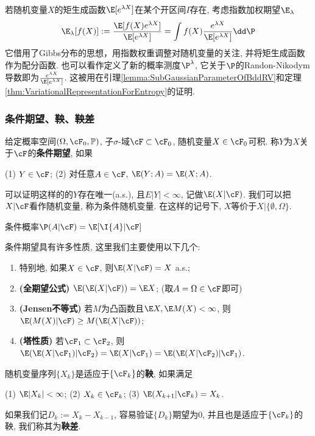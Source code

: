 \begin{example}[指数加权]
	若随机变量$X$的矩生成函数$\E[e^{\lambda X}]$在某个开区间$I$存在, 考虑指数加权期望$\E_{\lambda}$
	\begin{equation*}
		\E_{\lambda} [f(X)]
		:= \frac{\E[f(X) e^{\lambda X}]}{\E[e^{\lambda X}]}
		= \int f(X) \frac{e^{\lambda X}}{\E[e^{\lambda X}]} \dd \P 
	\end{equation*}
	它借用了Gibbs分布的思想，用指数权重调整对随机变量的关注, 并将矩生成函数作为配分函数.  
	也可以看作定义了新的概率测度$\P^{\lambda}$, 它关于$\P$的Randon-Nikodym导数即为$\frac{e^{\lambda X}}{\E[e^{\lambda X}]}$. 
	这被用在引理\ref{lemma:SubGaussianParameterOfBddRV}和定理\ref{thm:VariationalRepresentationForEntropy}的证明.
\end{example}



\subsubsection{条件期望、鞅、鞅差}

给定概率空间$(\Omega, \cF_0, \mathbb{P})$, 子$\sigma$-域$\cF \subset \cF_0$, 随机变量$X \in \cF_0$可积. 
称$Y$为$X$关于$\cF$的\textbf{条件期望}, 如果
\begin{center}
	(1) $Y \in \cF$; \quad
	(2) 对任意$A \in \cF$, $\E(Y;A) = \E(X;A)$. 
\end{center}
可以证明这样的的$Y$存在唯一(a.s.), 且$E|Y| < \infty$, 记做$\E(X|\cF)$. 
我们可以把$X | \cF$看作随机变量, 称为条件随机变量. 
在这样的记号下, $X$等价于$X | \{\emptyset, \Omega\}$. 

条件概率$\P(A | \cF) = \E[\I{A} | \cF]$

条件期望具有许多性质, 这里我们主要使用以下几个: 
	\begin{enumerate}[label=(\roman*)]
		\item 特别地, 如果$X \in \cF$, 则$\E(X|\cF) = X$ a.s.;
		\item \textbf{(全期望公式)} $\E(\E(X|\cF)) = \E X$; (取$A = \Omega \in \cF$即可)
		\item \textbf{(Jensen不等式)} 若$M$为凸函数且$\E X, \E M(X) < \infty$, 则$\E(M(X) | \cF) \geq M(\E(X|\cF))$; 
		\item \textbf{(塔性质)} 若$\cF_1 \subset \cF_2$, 则$\E(\E(X|\cF_1)|\cF_2) = \E(X|\cF_1) = \E(\E(X|\cF_2)|\cF_1)$. 
	\end{enumerate}
随机变量序列$\{X_k\}$是适应于$\{\cF_k\}$的\textbf{鞅}, 如果满足
\begin{center}
	(1) $\E |X_k| < \infty$; \quad
	(2) $X_k \in \cF_k$; \quad
	(3) $\E(X_{k+1}|\cF_k) = X_k$.
\end{center}
如果我们记$D_k := X_k - X_{k-1}$, 容易验证$\{D_k\}$期望为$0$, 并且也是适应于$\{\cF_k\}$的鞅, 我们称其为\textbf{鞅差}. 

